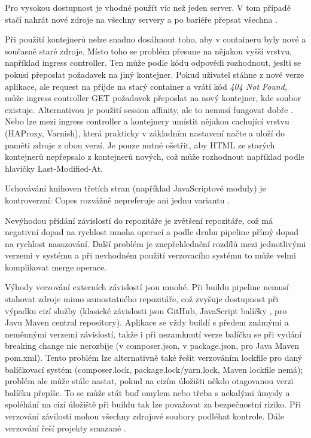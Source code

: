 
            Pro vysokou dostupnost je vhodné použít víc než jeden server. V tom případě stačí nahrát nové zdroje na všechny servery a po bariéře přepsat všechna \HTML.


            Při použití kontejnerů nelze snadno dosáhnout toho, aby v containeru byly nové a současně staré zdroje. Místo toho se problém přesune na nějakou vyšší vrstvu, například ingress controller. Ten může podle \HTTP kódu odpovědi rozhodnout, jeslti se pokusí přeposlat požadavek na jiný kontejner. Pokud uživatel stáhne \HTML z nové verze aplikace, ale request na  přijde na starý container a vrátí kód \textit{404 Not Found}, může ingress controller GET požadavek přeposlat na nový kontejner, kde soubor existuje. Alternativou je použití session affinity, ale to nemusí fungovat dobře . Nebo lze mezi ingress controller a kontejnery umístit nějakou cachující \HTTP vrstvu (HAProxy, Varnish), která prakticky v základním nastavení načte a uloží do paměti zdroje z obou verzí. Je pouze nutné ošetřit, aby HTML ze starých kontejnerů nepřepsalo \HTML z kontejnerů nových, což může rozhodnout například podle hlavičky Last-Modified-At.


            Uchovávání knihoven třetích stran (například JavaScriptové   moduly) je kontroverzní: Copes rozvážně nepreferuje ani jednu variantu \cite{copes-commit-npm} .

             Nevýhodou přidání závislostí do repozitáře je zvětšení repozitáře, což má negativní dopad na rychlost mnoha operací a podle druhu \CICD pipeline přímý dopad na rychlost nasazování. Další problém je znepřehlednění rozdílů mezi jednotlivými verzemi v systému a při nevhodném použití verzovacího systému to může velmi komplikovat merge operace.

             Výhody verzování externích závislostí jsou mnohé. Při buildu \CICD pipeline nemusí stahovat zdroje mimo samostatného repozitáře, což zvyšuje dostupnost při výpadku cizí služby (klasické závislosti jsou GitHub, JavaScript balíčky , pro Javu Maven central repository). Aplikace se vždy buildí s předem známými a neměnnými verzemi závislostí, takže i při nezamknutí verze balíčku se při vydání breaking change nic nerozbije (v  composer.json, v  package.json, pro Java Maven pom.xml). Tento problém lze alternativně také řešit verzováním lockfile pro daný balíčkovací systém (composer.lock, package.lock/yarn.lock, Maven lockfile nemá); problém ale může stále nastat, pokud na cizím úložišti někdo otagovanou verzi balíčku přepíše. To se může stát buď omylem nebo třeba s nekalými úmysly a spoléhání na cizí úložiště při buildu tak lze považovat za bezpečnostní riziko. Při verzování závilostí mohou všechny zdrojové soubory podléhat kontrole. Dále verzování řeší projekty smazané \cite{williams-left-pad}.

